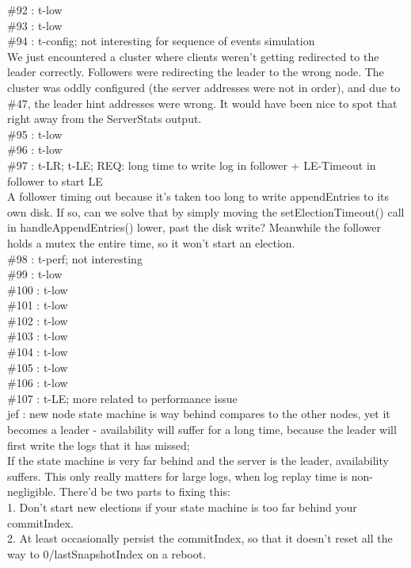 \#92 : t-low\\
\#93 : t-low\\
\#94 : t-config; not interesting for sequence of events simulation\\
We just encountered a cluster where clients weren't getting redirected to the leader 
correctly. Followers were redirecting the leader to the wrong node. The cluster 
was oddly configured (the server addresses were not in order), and due to \#47, the 
leader hint addresses were wrong. It would have been nice to spot that right away 
from the ServerStats output.\\
\#95 : t-low\\
\#96 : t-low\\
\#97 : t-LR; t-LE; REQ: long time to write log in follower + LE-Timeout in follower to start LE\\
A follower timing out because it's taken too long to write appendEntries to its own disk. If 
so, can we solve that by simply moving the setElectionTimeout() call in 
handleAppendEntries() lower, past the disk write? Meanwhile the follower holds 
a mutex the entire time, so it won't start an election.\\
\#98 : t-perf; not interesting\\
\#99 : t-low\\
\#100 : t-low\\
\#101 : t-low\\
\#102 : t-low\\
\#103 : t-low\\
\#104 : t-low\\
\#105 : t-low\\
\#106 : t-low\\
\#107 : t-LE; more related to performance issue\\
jef : new node state machine is way behind compares to the other nodes, yet it
becomes a leader - availability will suffer for a long time, because the leader will
first write the logs that it has missed;\\
If the state machine is very far behind and the server is the leader, availability 
suffers. This only really matters for large logs, when log replay time is 
non-negligible. There'd be two parts to fixing this:\\
1. Don't start new elections if your state machine is too far behind your 
commitIndex.\\
2. At least occasionally persist the commitIndex, so that it doesn't reset all the 
way to 0/lastSnapshotIndex on a reboot.\\
